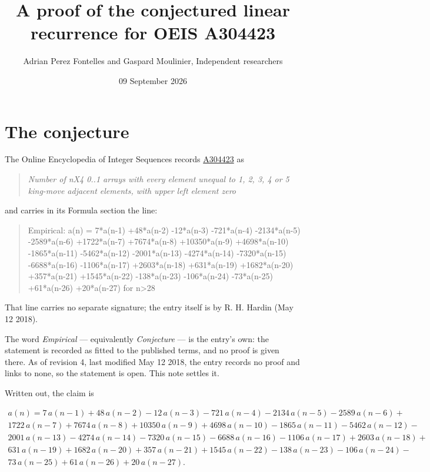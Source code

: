 \documentclass[11pt]{article}
\title{A proof of the conjectured linear recurrence for OEIS A304423}
\author{Adrian Perez Fontelles and Gaspard Moulinier, Independent researchers}
\date{09 September 2026}
\theoremstyle{definition}
\begin{document}
\maketitle
\section{The conjecture}

The Online Encyclopedia of Integer Sequences records \href{https://oeis.org/A304423}{A304423} as

\begin{quote}\itshape Number of nX4 0..1 arrays with every element unequal to 1, 2, 3, 4 or 5 king-move adjacent elements, with upper left element zero\end{quote}

and carries in its Formula section the line:

\begin{quote}\ttfamily Empirical: a(n) = 7*a(n-1) +48*a(n-2) -12*a(n-3) -721*a(n-4) -2134*a(n-5) -2589*a(n-6) +1722*a(n-7) +7674*a(n-8) +10350*a(n-9) +4698*a(n-10) -1865*a(n-11) -5462*a(n-12) -2001*a(n-13) -4274*a(n-14) -7320*a(n-15) -6688*a(n-16) -1106*a(n-17) +2603*a(n-18) +631*a(n-19) +1682*a(n-20) +357*a(n-21) +1545*a(n-22) -138*a(n-23) -106*a(n-24) -73*a(n-25) +61*a(n-26) +20*a(n-27) for n>28\end{quote}

That line carries no separate signature; the entry itself is by R. H. Hardin (May 12 2018).

The word {\itshape Empirical} --- equivalently {\itshape Conjecture} --- is the entry's own: the statement is recorded as fitted to the published terms, and no proof is given there. As of revision 4, last modified May 12 2018, the entry records no proof and links to none, so the statement is open. This note settles it.

Written out, the claim is

\begin{multline*} a(n) = 7\,a(n-1) + 48\,a(n-2) - 12\,a(n-3) - 721\,a(n-4) - 2134\,a(n-5) - 2589\,a(n-6) + \\ 1722\,a(n-7) + 7674\,a(n-8) + 10350\,a(n-9) + 4698\,a(n-10) - 1865\,a(n-11) - 5462\,a(n-12) - \\ 2001\,a(n-13) - 4274\,a(n-14) - 7320\,a(n-15) - 6688\,a(n-16) - 1106\,a(n-17) + 2603\,a(n-18) + \\ 631\,a(n-19) + 1682\,a(n-20) + 357\,a(n-21) + 1545\,a(n-22) - 138\,a(n-23) - 106\,a(n-24) - \\ 73\,a(n-25) + 61\,a(n-26) + 20\,a(n-27). \end{multline*}
\end{document}
